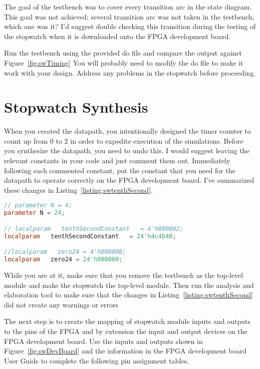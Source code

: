 The goal of the testbench was to cover every transition arc in the state
diagram. This goal was not achieved; several transition arc was not
taken in the testbench, which one was it? I'd suggest double checking
this transition during the testing of the stopwatch when it is
downloaded onto the FPGA development board.

Run the testbench using the provided do file and compare the output
against Figure~\ref{fig:swTiming} You will probably need to modify the do
file to make it work with your design. Address any problems in the
stopwatch before proceeding.

\section{Stopwatch Synthesis}

When you created the datapath, you intentionally designed the timer
counter to count up from 0 to 2 in order to expedite execution of the
simulations. Before you synthesize the datapath, you need to undo this.
I would suggest leaving the relevant constants in your code and just
comment them out. Immediately following each commented constant, put the
constant that you need for the datapath to operate correctly on the
FPGA development board. I've summarized these changes in Listing~\ref{listing:swtenthSecond}.

\begin{lstlisting}[language=Verilog,
 caption={Changes to the datapath that will allow it to run properly on the FPGA development board.},
 label={listing:swtenthSecond},
 frame=single]
// parameter N = 4;	
parameter N = 24;	

// localparam   tenthSecondConstant   = 4'h000002;
localparam   tenthSecondConstant   = 24'h4c4b40;

//localparam   zero24 = 4'h000000;
localparam   zero24 = 24'h000000;
\end{lstlisting}


While you are at it, make sure that you remove the testbench as the
top-level module and make the stopwatch the top-level module. Then run
the analysis and elaboration tool to make sure that the changes in
Listing~\ref{listing:swtenthSecond} did not create any warnings or errors

The next step is to create the mapping of stopwatch module inputs and
outputs to the pins of the FPGA and by extension the input and output
devices on the FPGA development board. Use the inputs and outputs shown in
Figure~\ref{fig:swDevBoard} and the information in the FPGA development board User Guide to complete
the following pin assignment tables.

